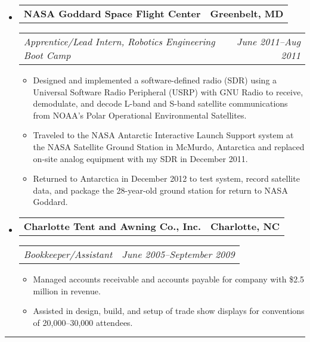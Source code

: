 \documentclass[10pt,letterpaper]{article}
\newcommand{\headerrow}[2]{%
    \begin{tabularx}{\linewidth}{Xr}
	    #1 & #2 \\
    \end{tabularx}
}
\begin{document}
\begin{itemize}
	\item
	\headerrow{\textbf{NASA Goddard Space Flight Center}}{\textbf{Greenbelt, MD}}
	\headerrow{\emph{Apprentice/Lead Intern, Robotics Engineering Boot Camp}}
		{\emph{June 2011--Aug 2011}}
	\begin{itemize}
        \item Designed and implemented a software-defined radio (SDR) using a
            Universal Software Radio Peripheral (USRP) with GNU Radio to
            receive, demodulate, and decode L-band and S-band satellite
            communications from NOAA's Polar Operational Environmental
            Satellites.

        \item Traveled to the NASA Antarctic Interactive Launch Support
            system at the NASA Satellite Ground Station in McMurdo, Antarctica
            and replaced on-site analog equipment with my SDR in December 2011.

        \item Returned to Antarctica in December 2012 to test system, record
            satellite data, and package the 28-year-old ground station for
            return to NASA Goddard.
	\end{itemize}

	\item
	\headerrow{\textbf{Charlotte Tent and Awning Co., Inc.}}{\textbf{Charlotte, NC}}
	\headerrow{\emph{Bookkeeper/Assistant}}{\emph{June 2005--September 2009}}
	\begin{itemize}
        \item Managed accounts receivable and accounts payable for company with
            \$2.5 million in revenue.

        \item Assisted in design, build, and setup of trade show displays for
            conventions of 20,000--30,000 attendees.
	\end{itemize}

\end{itemize}

\hrule
\vspace{-0.4em}
\end{document}
